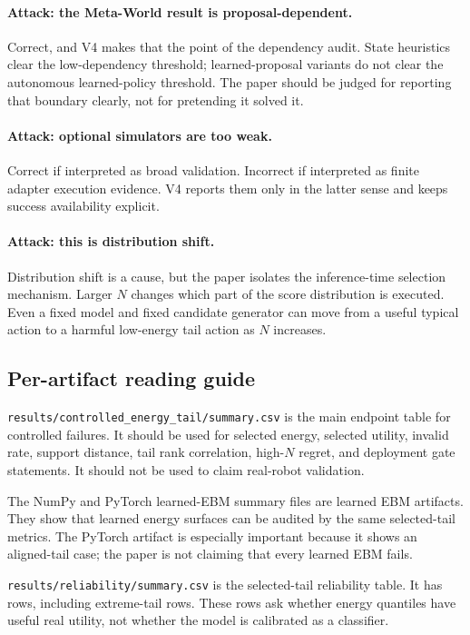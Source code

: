 \paragraph{Attack: the Meta-World result is proposal-dependent.}
Correct, and V4 makes that the point of the dependency audit. State heuristics
clear the low-dependency threshold; learned-proposal variants do not clear the
autonomous learned-policy threshold. The paper should be judged for reporting
that boundary clearly, not for pretending it solved it.

\paragraph{Attack: optional simulators are too weak.}
Correct if interpreted as broad validation. Incorrect if interpreted as finite
adapter execution evidence. V4 reports them only in the latter sense and keeps
success availability explicit.

\paragraph{Attack: this is distribution shift.}
Distribution shift is a cause, but the paper isolates the inference-time
selection mechanism. Larger \(N\) changes which part of the score distribution
is executed. Even a fixed model and fixed candidate generator can move from a
useful typical action to a harmful low-energy tail action as \(N\) increases.

\subsection{Per-artifact reading guide}
\label{app:V4-artifact-reading-guide}

\texttt{results/controlled\_energy\_tail/summary.csv} is the main endpoint
table for controlled failures. It should be used for selected energy,
selected utility, invalid rate, support distance, tail rank correlation,
high-\(N\) regret, and deployment gate statements. It should not be used to
claim real-robot validation.

The NumPy and PyTorch learned-EBM summary files are learned EBM artifacts.
They show that learned energy surfaces can be audited by the same selected-tail
metrics. The PyTorch artifact is especially important because it shows an
aligned-tail case; the paper is not claiming that every learned EBM fails.

\texttt{results/reliability/summary.csv} is the selected-tail reliability
table. It has \VFourEBMReliabilityRows{} rows, including
\VFourEBMReliabilityExtremeRows{} extreme-tail rows. These rows ask whether
energy quantiles have useful real utility, not whether the model is calibrated
as a classifier.

